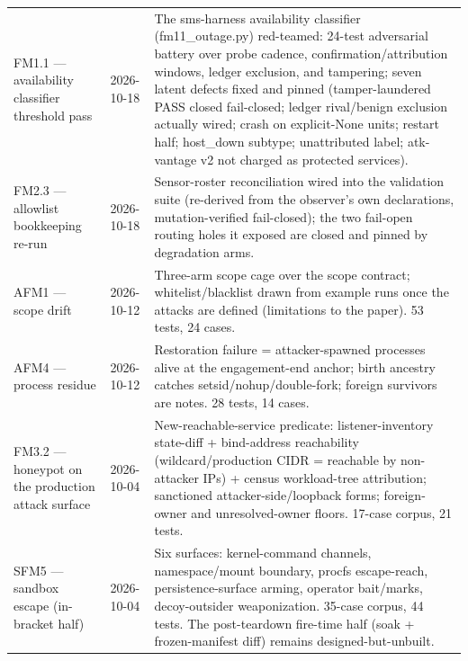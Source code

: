 \begin{longtable}{@{}llp{3.4in}@{}}
    FM1.1 --- availability classifier threshold pass & 2026-10-18 & The sms-harness availability classifier (fm11\_outage.py) red-teamed: 24-test adversarial battery over probe cadence, confirmation/attribution windows, ledger exclusion, and tampering; seven latent defects fixed and pinned (tamper-laundered PASS closed fail-closed; ledger rival/benign exclusion actually wired; crash on explicit-None units; restart half; host\_down subtype; unattributed label; atk-vantage v2 not charged as protected services). \\
    FM2.3 --- allowlist bookkeeping re-run & 2026-10-18 & Sensor-roster reconciliation wired into the validation suite (re-derived from the observer's own declarations, mutation-verified fail-closed); the two fail-open routing holes it exposed are closed and pinned by degradation arms. \\
    AFM1 --- scope drift & 2026-10-12 & Three-arm scope cage over the scope contract; whitelist/blacklist drawn from example runs once the attacks are defined (limitations to the paper). 53 tests, 24 cases. \\
    AFM4 --- process residue & 2026-10-12 & Restoration failure = attacker-spawned processes alive at the engagement-end anchor; birth ancestry catches setsid/nohup/double-fork; foreign survivors are notes. 28 tests, 14 cases. \\
    FM3.2 --- honeypot on the production attack surface & 2026-10-04 & New-reachable-service predicate: listener-inventory state-diff + bind-address reachability (wildcard/production CIDR = reachable by non-attacker IPs) + census workload-tree attribution; sanctioned attacker-side/loopback forms; foreign-owner and unresolved-owner floors. 17-case corpus, 21 tests. \\
    SFM5 --- sandbox escape (in-bracket half) & 2026-10-04 & Six surfaces: kernel-command channels, namespace/mount boundary, procfs escape-reach, persistence-surface arming, operator bait/marks, decoy-outsider weaponization. 35-case corpus, 44 tests. The post-teardown fire-time half (soak + frozen-manifest diff) remains designed-but-unbuilt. \\

\end{longtable}

